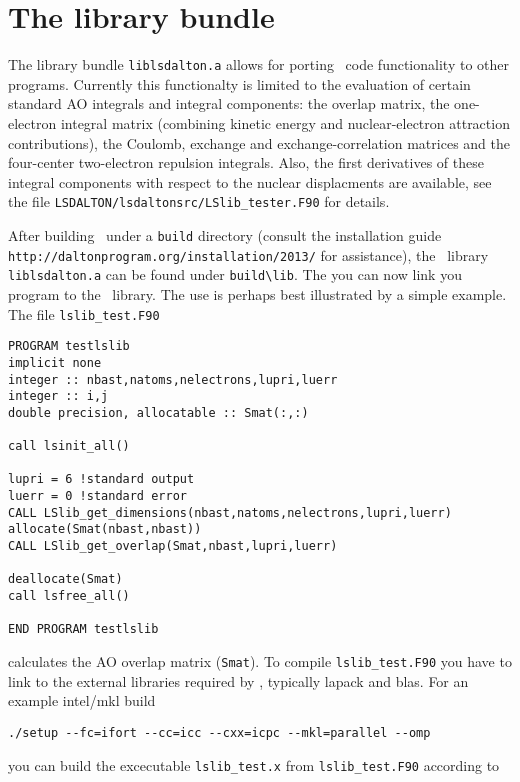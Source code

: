 \section{The {\lsdalton} library bundle}
\label{sec:LSlib}

The {\lsdalton} library bundle \verb|liblsdalton.a| allows for porting \lsdalton\ code 
functionality to other programs. Currently this functionalty is limited to 
the evaluation of certain standard AO integrals and integral components: the overlap 
matrix, the one-electron integral matrix (combining kinetic energy and 
nuclear-electron attraction contributions), the Coulomb, exchange and exchange-correlation 
matrices and the four-center two-electron repulsion integrals. Also, the 
first derivatives of these integral components with respect to the nuclear displacments 
are available, see the file \verb|LSDALTON/lsdaltonsrc/LSlib_tester.F90|
for details. 

After building \lsdalton\ under a \verb|build| directory (consult the installation guide
\verb|http://daltonprogram.org/installation/2013/| for assistance), the \lsdalton\ library 
\verb|liblsdalton.a| can be found under \verb|build\lib|. The you can now link you 
program to the \lsdalton\ library. 
The use is perhaps best illustrated by a simple example. The file \verb|lslib_test.F90|

\begin{verbatim}
PROGRAM testlslib
implicit none
integer :: nbast,natoms,nelectrons,lupri,luerr
integer :: i,j
double precision, allocatable :: Smat(:,:)

call lsinit_all()

lupri = 6 !standard output
luerr = 0 !standard error
CALL LSlib_get_dimensions(nbast,natoms,nelectrons,lupri,luerr)
allocate(Smat(nbast,nbast))
CALL LSlib_get_overlap(Smat,nbast,lupri,luerr)

deallocate(Smat)
call lsfree_all()

END PROGRAM testlslib
\end{verbatim}
%
calculates the AO overlap matrix (\verb|Smat|). To compile \verb|lslib_test.F90|
you have to link to the external libraries required by \lsdalton, typically lapack
and blas. For an example intel/mkl build

\begin{verbatim}
./setup --fc=ifort --cc=icc --cxx=icpc --mkl=parallel --omp
\end{verbatim}
%
you can build the excecutable \verb|lslib_test.x| from \verb|lslib_test.F90| according to

